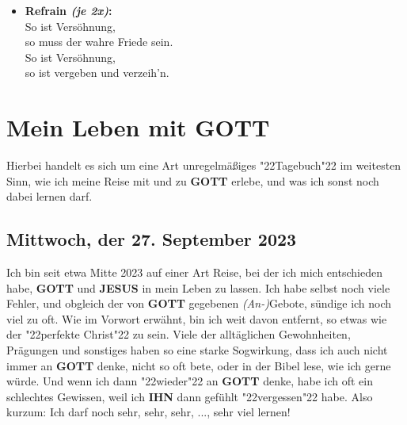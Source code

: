 \documentclass[10pt,a5paper]{article}
\newcommand{\Gott}[0]{\textbf{GOTT}}
\newcommand{\Ihn}[0]{\textbf{IHN}}
\newcommand{\Jesus}[0]{\textbf{JESUS}}
\newcommand{\Selbst}[0]{\textbf{SELBST}}
\newcommand{\q}[1]{\char"22{#1}\char"22 }
\begin{document}
\begin{itemize}
			\\		Wie der Fr\"uhling,
					wie der Morgen,
			\\		Wie ein Lied,
					wie ein Gedicht.
			\\		Wie das Leben,
					wie die Liebe,
			\\		Wie {\Gott} {\Selbst},
					das wahre Licht!
			\item	\textbf{Refrain \textit{(je 2x)}:}
			\\		So ist Vers\"ohnung,
			\\		so muss der wahre Friede sein.
			\\		So ist Vers\"ohnung,
			\\		so ist vergeben und verzeih'n.
		\end{itemize}

	\newpage
	\section{Mein Leben mit {\Gott}} \label{MeinLebenMitGott}
		Hierbei handelt es sich um eine Art unregelm\"a{\ss}iges \q{Tagebuch} im weitesten Sinn,
		wie ich meine Reise mit und zu {\Gott} erlebe,
		und was ich sonst noch dabei lernen darf.
	
	\subsection{Mittwoch, der 27. September 2023}
		Ich bin seit etwa Mitte 2023 auf einer Art Reise,
		bei der ich mich entschieden habe,
		{\Gott} und {\Jesus} in mein Leben zu lassen.
		Ich habe selbst noch viele Fehler,
		und obgleich der von {\Gott} gegebenen \textit{(An-)}Gebote,
		s\"undige ich noch viel zu oft.
		Wie im Vorwort erw\"ahnt,
		bin ich weit davon entfernt,
		so etwas wie der \q{perfekte Christ} zu sein.
		Viele der allt\"aglichen Gewohnheiten,
		Pr\"agungen und sonstiges haben so eine starke Sogwirkung,
		dass ich auch nicht immer an {\Gott} denke,
		nicht so oft bete,
		oder in der Bibel lese,
		wie ich gerne w\"urde.
		Und wenn ich dann \q{wieder} an {\Gott} denke,
		habe ich oft ein schlechtes Gewissen,
		weil ich {\Ihn} dann gef\"uhlt \q{vergessen} habe.
		Also kurzum:
		Ich darf noch sehr, sehr, sehr, ..., sehr viel lernen!
		
\end{document}
